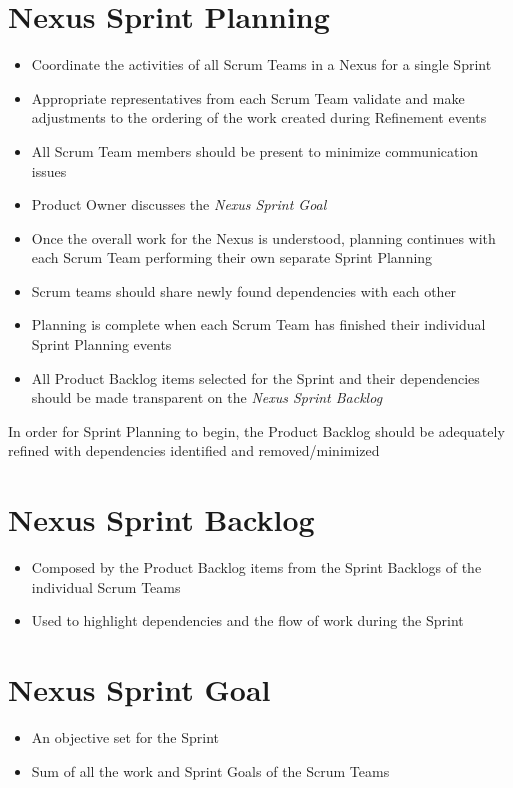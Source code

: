 \documentclass[a4paper,11pt,twocolumn]{article}
\begin{document}
\section*{Nexus Sprint Planning}
\begin{itemize}
	\item Coordinate the activities of all Scrum Teams in a Nexus for a single Sprint
	\item Appropriate representatives from each Scrum Team validate and make adjustments to the ordering of the work created during Refinement events
	\item All Scrum Team members should be present to minimize communication issues
	\item Product Owner discusses the \textit{Nexus Sprint Goal}
	\item Once the overall work for the Nexus is understood, planning continues with each Scrum Team performing their own separate Sprint Planning
	\item Scrum teams should share newly found dependencies with each other
	\item Planning is complete when each Scrum Team has finished their individual Sprint Planning events
	\item All Product Backlog items selected for the Sprint and their dependencies should be made transparent on the \textit{Nexus Sprint Backlog}
\end{itemize}

\begin{tcolorbox}[colback=black!8!white,colframe=gray!50!black,title=Note,sharp corners,fonttitle=\normalsize\bfseries,fontupper=\normalsize]
	In order for Sprint Planning to begin, the Product Backlog should be adequately refined with dependencies identified and removed/minimized
\end{tcolorbox}

\section*{Nexus Sprint Backlog}
\begin{itemize}
	\item Composed by the Product Backlog items from the Sprint Backlogs of the individual Scrum Teams
	\item Used to highlight dependencies and the flow of work during the Sprint
\end{itemize}

\section*{Nexus Sprint Goal}
\begin{itemize}
	\item An objective set for the Sprint
	\item Sum of all the work and Sprint Goals of the Scrum Teams
\end{itemize}
\end{document}

